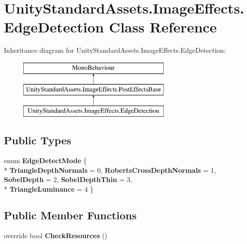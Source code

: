 \hypertarget{class_unity_standard_assets_1_1_image_effects_1_1_edge_detection}{}\section{Unity\+Standard\+Assets.\+Image\+Effects.\+Edge\+Detection Class Reference}
\label{class_unity_standard_assets_1_1_image_effects_1_1_edge_detection}
Inheritance diagram for Unity\+Standard\+Assets.\+Image\+Effects.\+Edge\+Detection\+:\begin{figure}[H]
\begin{center}
\leavevmode
\includegraphics[height=3.000000cm]{class_unity_standard_assets_1_1_image_effects_1_1_edge_detection}
\end{center}
\end{figure}
\subsection*{Public Types}
\begin{DoxyCompactItemize}
\item 
enum {\bfseries Edge\+Detect\+Mode} \{ \\*
{\bfseries Triangle\+Depth\+Normals} = 0, 
{\bfseries Roberts\+Cross\+Depth\+Normals} = 1, 
{\bfseries Sobel\+Depth} = 2, 
{\bfseries Sobel\+Depth\+Thin} = 3, 
\\*
{\bfseries Triangle\+Luminance} = 4
 \}\hypertarget{class_unity_standard_assets_1_1_image_effects_1_1_edge_detection_a6da59c4041099c1f590eb1e4fc64d0b1}{}\label{class_unity_standard_assets_1_1_image_effects_1_1_edge_detection_a6da59c4041099c1f590eb1e4fc64d0b1}

\end{DoxyCompactItemize}
\subsection*{Public Member Functions}
\begin{DoxyCompactItemize}
\item 
override bool {\bfseries Check\+Resources} ()\hypertarget{class_unity_standard_assets_1_1_image_effects_1_1_edge_detection_ac72609e0a21d65869e4240c8511d8b83}{}\label{class_unity_standard_assets_1_1_image_effects_1_1_edge_detection_ac72609e0a21d65869e4240c8511d8b83}

\end{DoxyCompactItemize}
